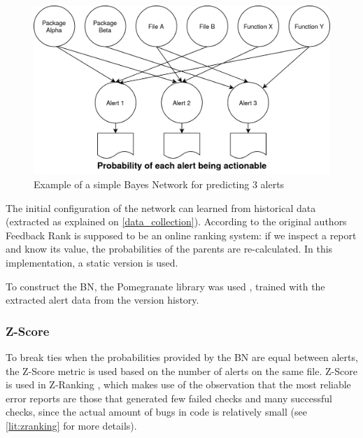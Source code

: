 
\begin{figure}[H]
	\centering
	\includegraphics[scale=0.2]{./src/bayes_example.png}
	\caption{Example of a simple Bayes Network for predicting 3 alerts}
\end{figure}

The initial configuration of the network can learned from historical data (extracted as explained on \cref{data_collection}). According to the original authors Feedback Rank is supposed to be an online ranking system: if we inspect a report and know its value, the probabilities of the parents are re-calculated. In this implementation, a static version is used. 

To construct the BN, the Pomegranate library was used \cite{pomegranate}, trained with the extracted alert data from the version history. 


\subsubsection{Z-Score}

To break ties when the probabilities provided by the BN are equal between alerts, the Z-Score metric is used based on the number of alerts on the same file. Z-Score is used in Z-Ranking \cite{z-ranking}, which makes use of the observation that the most reliable error reports are those that generated few failed checks and many successful checks, since the actual amount of bugs in code is relatively small (see \cref{lit:zranking} for more details). 

